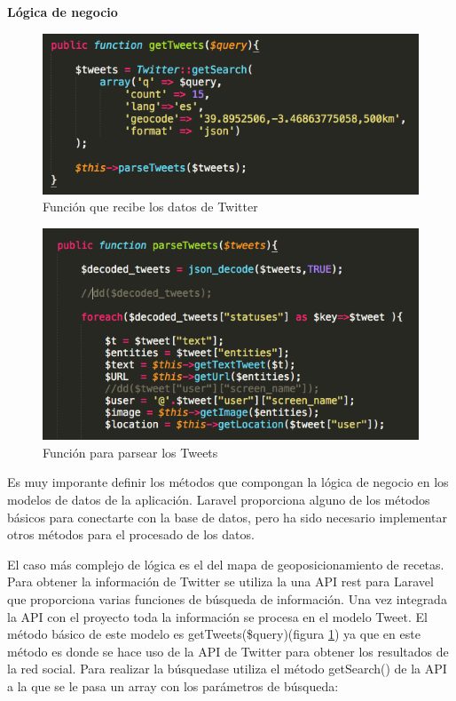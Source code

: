 \vspace{5 mm}

\textbf{Lógica de negocio}

\begin{figure}
\begin{center}
\includegraphics[width=1.0\textwidth]{imagenes/getTweets.png}
\caption{Función que recibe los datos de Twitter}
\label{getTweets-app}
\end{center}
\end{figure}

\begin{figure}
\begin{center}
\includegraphics[width=1.0\textwidth]{imagenes/parseTweets.png}
\caption{Función para parsear los Tweets}
\label{parseTweets-app}
\end{center}
\end{figure}

Es muy imporante definir los métodos que compongan la lógica de negocio en los modelos de datos de la aplicación. Laravel proporciona alguno de los métodos básicos para conectarte con la base de datos, pero ha sido necesario implementar otros métodos para el procesado de los datos.

El caso más complejo de lógica es el del mapa de geoposicionamiento de recetas. Para obtener la información de Twitter se utiliza la una API rest para Laravel que proporciona varias funciones de búsqueda de información. Una vez integrada la API con el proyecto toda la información se procesa en el modelo Tweet. El método básico de este modelo es getTweets(\$query)(figura \ref{getTweets-app}) ya que en este método es donde se hace uso de la API de Twitter para obtener los resultados de la red social. Para realizar la búsquedase utiliza el método getSearch() de la API a la que se le pasa un array con los parámetros de búsqueda:

